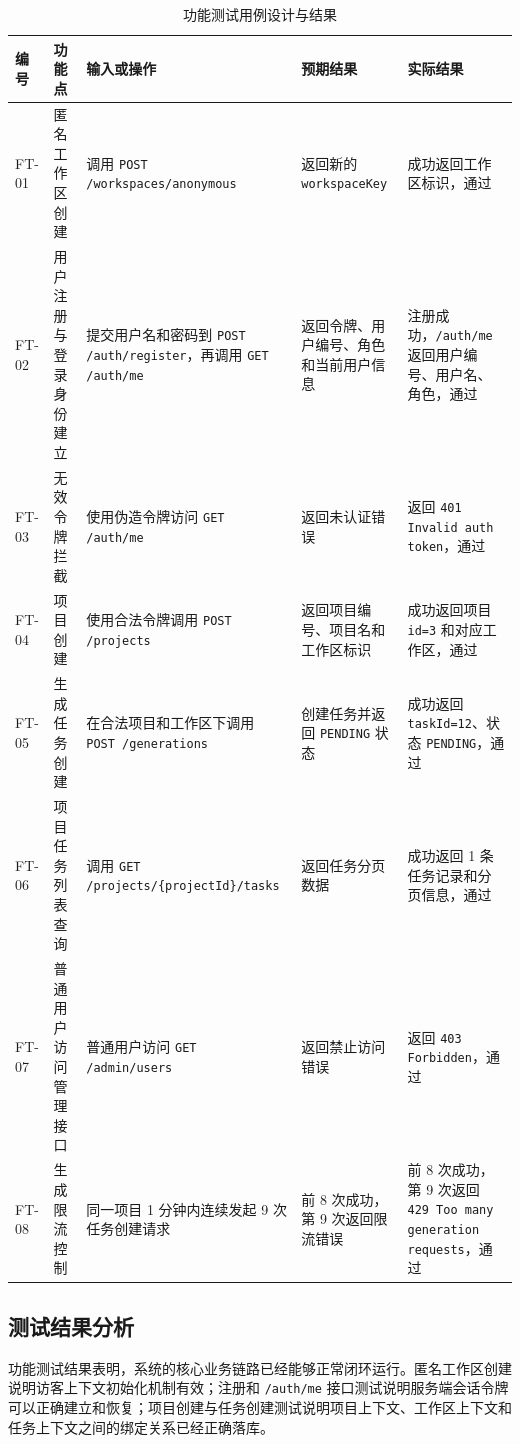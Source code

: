 \begin{table}[!htbp]
\centering
\caption{功能测试用例设计与结果}
\label{tab:chapter6-functional-case}
\footnotesize
\begin{tabular}{@{}p{}p{}p{}p{}p{}@{}}
\toprule
编号 & 功能点 & 输入或操作 & 预期结果 & 实际结果 \\
\midrule
FT-01 & 匿名工作区创建 & 调用 \texttt{POST /workspaces/anonymous} & 返回新的 \texttt{workspaceKey} & 成功返回工作区标识，通过 \\
FT-02 & 用户注册与登录身份建立 & 提交用户名和密码到 \texttt{POST /auth/register}，再调用 \texttt{GET /auth/me} & 返回令牌、用户编号、角色和当前用户信息 & 注册成功，\texttt{/auth/me} 返回用户编号、用户名、角色，通过 \\
FT-03 & 无效令牌拦截 & 使用伪造令牌访问 \texttt{GET /auth/me} & 返回未认证错误 & 返回 \texttt{401 Invalid auth token}，通过 \\
FT-04 & 项目创建 & 使用合法令牌调用 \texttt{POST /projects} & 返回项目编号、项目名和工作区标识 & 成功返回项目 \texttt{id=3} 和对应工作区，通过 \\
FT-05 & 生成任务创建 & 在合法项目和工作区下调用 \texttt{POST /generations} & 创建任务并返回 \texttt{PENDING} 状态 & 成功返回 \texttt{taskId=12}、状态 \texttt{PENDING}，通过 \\
FT-06 & 项目任务列表查询 & 调用 \texttt{GET /projects/\{projectId\}/tasks} & 返回任务分页数据 & 成功返回 1 条任务记录和分页信息，通过 \\
FT-07 & 普通用户访问管理接口 & 普通用户访问 \texttt{GET /admin/users} & 返回禁止访问错误 & 返回 \texttt{403 Forbidden}，通过 \\
FT-08 & 生成限流控制 & 同一项目 1 分钟内连续发起 9 次任务创建请求 & 前 8 次成功，第 9 次返回限流错误 & 前 8 次成功，第 9 次返回 \texttt{429 Too many generation requests}，通过 \\
\bottomrule
\end{tabular}
\end{table}

\subsection{测试结果分析}
功能测试结果表明，系统的核心业务链路已经能够正常闭环运行。匿名工作区创建说明访客上下文初始化机制有效；注册和 \texttt{/auth/me} 接口测试说明服务端会话令牌可以正确建立和恢复；项目创建与任务创建测试说明项目上下文、工作区上下文和任务上下文之间的绑定关系已经正确落库。

